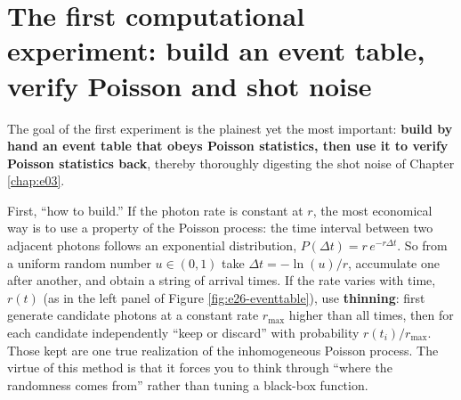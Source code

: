 \section{The first computational experiment: build an event table, verify Poisson and shot noise}
\label{sec:e26-poisson}

The goal of the first experiment is the plainest yet the most important: \textbf{build by hand an event table that obeys Poisson statistics, then use it to verify Poisson statistics back}, thereby thoroughly digesting the shot noise of Chapter \ref{chap:e03}.

First, ``how to build.'' If the photon rate is constant at \(r\), the most economical way is to use a property of the Poisson process: the time interval between two adjacent photons follows an exponential distribution, \(P(\Delta t)=r\,e^{-r\Delta t}\). So from a uniform random number \(u\in(0,1)\) take \(\Delta t=-\ln(u)/r\), accumulate one after another, and obtain a string of arrival times. If the rate varies with time, \(r(t)\) (as in the left panel of Figure \ref{fig:e26-eventtable}), use \textbf{thinning}: first generate candidate photons at a constant rate \(r_{\max}\) higher than all times, then for each candidate independently ``keep or discard'' with probability \(r(t_i)/r_{\max}\). Those kept are one true realization of the inhomogeneous Poisson process. The virtue of this method is that it forces you to think through ``where the randomness comes from'' rather than tuning a black-box function.

